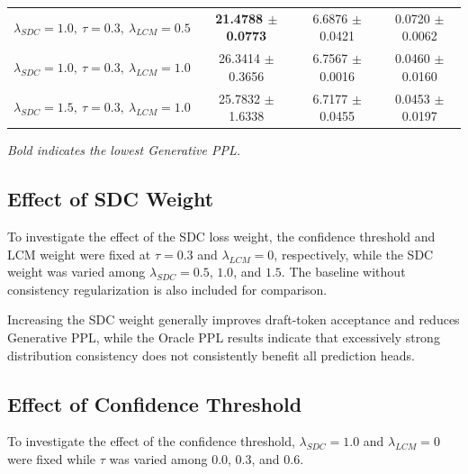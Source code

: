 \begin{table}[!htbp]
\begin{tabular}{lccc}
        \midrule

        $\lambda_{SDC}=1.0,\ \tau=0.3,\ \lambda_{LCM}=0.5$
        & \textbf{21.4788 $\pm$ 0.0773}
        & 6.6876 $\pm$ 0.0421
        & 0.0720 $\pm$ 0.0062 \\

        $\lambda_{SDC}=1.0,\ \tau=0.3,\ \lambda_{LCM}=1.0$
        & 26.3414 $\pm$ 0.3656
        & 6.7567 $\pm$ 0.0016
        & 0.0460 $\pm$ 0.0160 \\

        $\lambda_{SDC}=1.5,\ \tau=0.3,\ \lambda_{LCM}=1.0$
        & 25.7832 $\pm$ 1.6338
        & 6.7177 $\pm$ 0.0455
        & 0.0453 $\pm$ 0.0197 \\

        \bottomrule[1.25pt]
    \end{tabular}

    \vspace{2mm}
    
    \footnotesize{\textit{Bold indicates the lowest Generative PPL.}}
\end{table}

\FloatBarrier

\subsection{Effect of SDC Weight}\label{subsece:effect_of_sdc_weight}

To investigate the effect of the SDC loss weight, the confidence threshold
and LCM weight were fixed at $\tau=0.3$ and $\lambda_{LCM}=0$, respectively, while
the SDC weight was varied among $\lambda_{SDC}=0.5$, $1.0$, and $1.5$. The baseline
without consistency regularization is also included for comparison.

Increasing the SDC weight generally improves draft-token acceptance and
reduces Generative PPL, while the Oracle PPL results indicate that excessively
strong distribution consistency does not consistently benefit all prediction
heads.

\subsection{Effect of Confidence Threshold}\label{subsece:effect_of_confidence_threshold}

To investigate the effect of the confidence threshold, $\lambda_{SDC}=1.0$ and
$\lambda_{LCM}=0$ were fixed while $\tau$ was varied among 0.0, 0.3, and 0.6.

